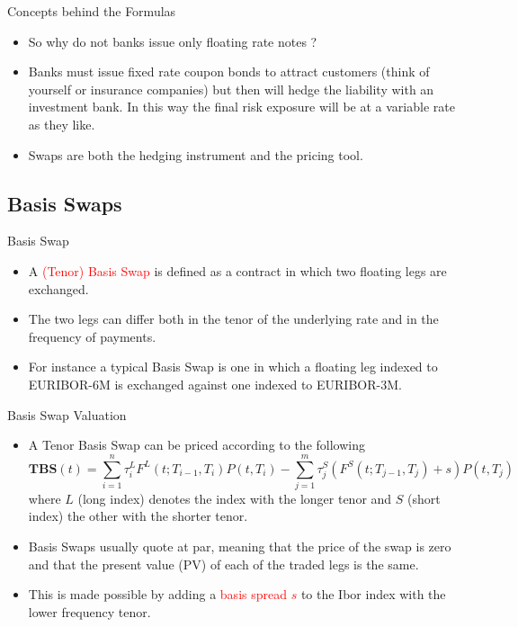 \documentclass{beamer}
\begin{document}
\begin{frame}{Concepts behind the Formulas}
	\begin{itemize}
		\item<1-> So why do not banks issue only floating rate notes ?
		\item<2-> Banks must issue fixed rate coupon bonds to attract customers (think of yourself or insurance companies) but then will hedge the liability  with an investment bank. In this way the final risk exposure will be at a variable rate as they like. 
		\item<3-> Swaps are both the hedging instrument and the pricing tool.%
	\end{itemize}
\end{frame}

\subsection{Basis Swaps}
\begin{frame}{Basis Swap}
	\begin{itemize}
	\item A \textcolor{red}{(Tenor) Basis Swap} is defined as a contract in which two floating legs are exchanged.
	\item The two legs can differ both in the tenor of the underlying rate and in the frequency of payments.
	\item For instance a typical Basis Swap is one in which a floating leg indexed to EURIBOR-6M is exchanged against one indexed to EURIBOR-3M.
	\end{itemize}
\end{frame}

\begin{frame}{Basis Swap Valuation}
\begin{itemize}
	\item<1-> A Tenor Basis Swap can be priced according to the following
	\begin{equation}
	\textbf{TBS}(t) = \sum_{i=1}^n \tau_i^{L} F^{L}(t;T_{i-1},T_i)P(t,T_i) - \sum_{j=1}^m \tau_j^{S} (F^{S}(t;T_{j-1},T_j)+s)P(t,T_j)
	\end{equation}
	where $L$ (long index) denotes the index with the longer tenor and $S$ (short index) the other with the shorter tenor.
	\item<2-> Basis Swaps usually quote at par, meaning that the price of the swap is zero and that the present value (PV) of each of the traded legs is the same. 
	\item<3-> This is made possible by adding a \textcolor{red}{basis spread $s$} to the Ibor index with the lower frequency tenor.
	\end{itemize}
\end{frame}
\end{document}

